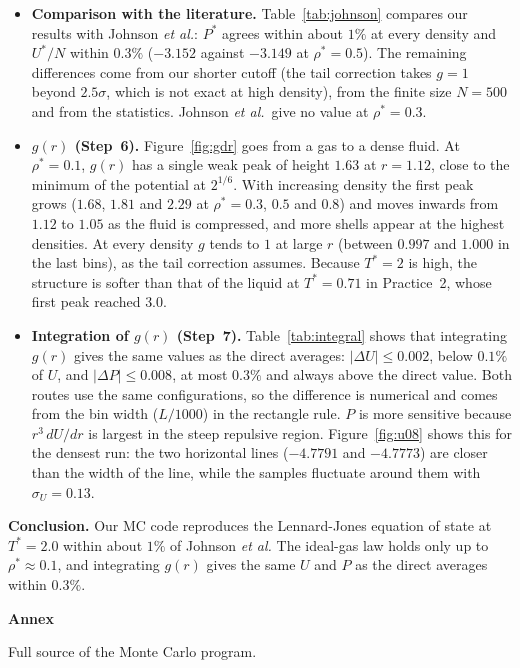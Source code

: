 \begin{itemize}
  \item \textbf{Comparison with the literature.} Table~\ref{tab:johnson} compares our results with Johnson \emph{et al.}: $P^*$ agrees within about $1\%$ at every density and $U^*/N$ within $0.3\%$ ($-3.152$ against $-3.149$ at $\rho^*=0.5$). The remaining differences come from our shorter cutoff (the tail correction takes $g=1$ beyond $2.5\sigma$, which is not exact at high density), from the finite size $N=500$ and from the statistics. Johnson \emph{et al.}\ give no value at $\rho^*=0.3$.

  \item \textbf{$g(r)$ (Step~6).} Figure~\ref{fig:gdr} goes from a gas to a dense fluid. At $\rho^*=0.1$, $g(r)$ has a single weak peak of height $1.63$ at $r=1.12$, close to the minimum of the potential at $2^{1/6}$. With increasing density the first peak grows ($1.68$, $1.81$ and $2.29$ at $\rho^*=0.3$, $0.5$ and $0.8$) and moves inwards from $1.12$ to $1.05$ as the fluid is compressed, and more shells appear at the highest densities. At every density $g$ tends to $1$ at large $r$ (between $0.997$ and $1.000$ in the last bins), as the tail correction assumes. Because $T^*=2$ is high, the structure is softer than that of the liquid at $T^*=0.71$ in Practice~2, whose first peak reached $3.0$.

  \item \textbf{Integration of $g(r)$ (Step~7).} Table~\ref{tab:integral} shows that integrating $g(r)$ gives the same values as the direct averages: $|\Delta U|\le0.002$, below $0.1\%$ of $U$, and $|\Delta P|\le0.008$, at most $0.3\%$ and always above the direct value. Both routes use the same configurations, so the difference is numerical and comes from the bin width ($L/1000$) in the rectangle rule. $P$ is more sensitive because $r^3\,dU/dr$ is largest in the steep repulsive region. Figure~\ref{fig:u08} shows this for the densest run: the two horizontal lines ($-4.7791$ and $-4.7773$) are closer than the width of the line, while the samples fluctuate around them with $\sigma_U=0.13$.
\end{itemize}

\textbf{Conclusion.} Our MC code reproduces the Lennard-Jones equation of state at $T^*=2.0$ within about $1\%$ of Johnson \emph{et al.} The ideal-gas law holds only up to $\rho^*\approx0.1$, and integrating $g(r)$ gives the same $U$ and $P$ as the direct averages within $0.3\%$.

\clearpage
\thispagestyle{empty}
\null
\vspace*{\fill}
\begin{center}
{\fontsize{48}{58}\selectfont\bfseries Annex}
\end{center}
\vspace*{\fill}
\clearpage
Full source of the Monte Carlo program.



